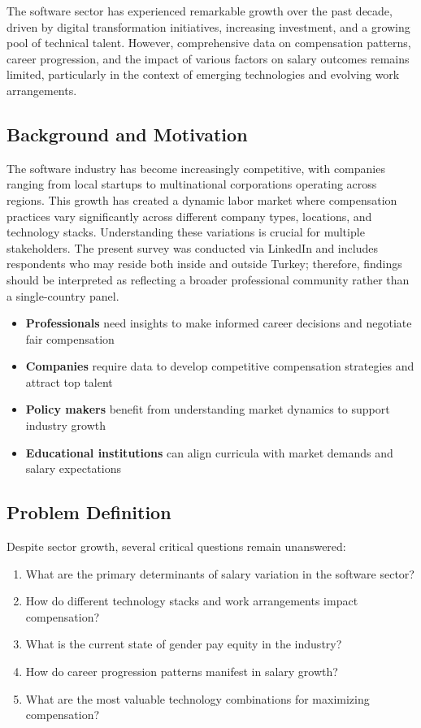 The software sector has experienced remarkable growth over the past decade, driven by digital transformation initiatives, increasing investment, and a growing pool of technical talent. However, comprehensive data on compensation patterns, career progression, and the impact of various factors on salary outcomes remains limited, particularly in the context of emerging technologies and evolving work arrangements.

\subsection*{Background and Motivation}

The software industry has become increasingly competitive, with companies ranging from local startups to multinational corporations operating across regions. This growth has created a dynamic labor market where compensation practices vary significantly across different company types, locations, and technology stacks. Understanding these variations is crucial for multiple stakeholders. The present survey was conducted via LinkedIn and includes respondents who may reside both inside and outside Turkey; therefore, findings should be interpreted as reflecting a broader professional community rather than a single-country panel.

\begin{itemize}[leftmargin=*]
  \item \textbf{Professionals} need insights to make informed career decisions and negotiate fair compensation
  \item \textbf{Companies} require data to develop competitive compensation strategies and attract top talent
  \item \textbf{Policy makers} benefit from understanding market dynamics to support industry growth
  \item \textbf{Educational institutions} can align curricula with market demands and salary expectations
\end{itemize}

\subsection*{Problem Definition}

Despite sector growth, several critical questions remain unanswered:

\begin{enumerate}[leftmargin=*]
  \item What are the primary determinants of salary variation in the software sector?
  \item How do different technology stacks and work arrangements impact compensation?
  \item What is the current state of gender pay equity in the industry?
  \item How do career progression patterns manifest in salary growth?
  \item What are the most valuable technology combinations for maximizing compensation?
\end{enumerate}

